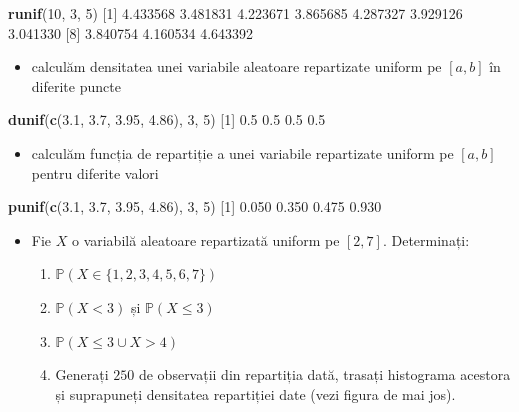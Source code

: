 \documentclass[]{article}
\newenvironment{Shaded}{\begin{snugshade}}{\end{snugshade}}
\newcommand{\KeywordTok}[1]{\textcolor[rgb]{0.13,0.29,0.53}{\textbf{#1}}}
\newcommand{\DecValTok}[1]{\textcolor[rgb]{0.00,0.00,0.81}{#1}}
\newcommand{\FloatTok}[1]{\textcolor[rgb]{0.00,0.00,0.81}{#1}}
\newcommand{\NormalTok}[1]{#1}
\providecommand{\tightlist}{%
  \setlength{\itemsep}{0pt}\setlength{\parskip}{0pt}}
\newenvironment{frshaded*}{%
  \def\FrameCommand{\fboxrule=\FrameRule\fboxsep=\FrameSep \fcolorbox{framecolor}{shadecolor1}}%
  \MakeFramed {\advance\hsize-\width \FrameRestore}}%
{\endMakeFramed}
\newenvironment{rmdblock}[1]
  {\begin{frshaded*}
  \begin{itemize}
  \renewcommand{\labelitemi}{
    \raisebox{-.7\height}[0pt][0pt]{
      {\setkeys{Gin}{width=2em,keepaspectratio}\texttt{[image: images/icons/\#1]}}
    }
  }
  \item
  }
  {
  \end{itemize}
  \end{frshaded*}
  }
\newenvironment{rmdexercise}
  {\begin{rmdblock}{exercise}}
  {\end{rmdblock}}
\begin{document}
\begin{Shaded}
\begin{Highlighting}[]
\KeywordTok{runif}\NormalTok{(}\DecValTok{10}\NormalTok{, }\DecValTok{3}\NormalTok{, }\DecValTok{5}\NormalTok{)}
\NormalTok{ [}\DecValTok{1}\NormalTok{] }\FloatTok{4.433568} \FloatTok{3.481831} \FloatTok{4.223671} \FloatTok{3.865685} \FloatTok{4.287327} \FloatTok{3.929126} \FloatTok{3.041330}
\NormalTok{ [}\DecValTok{8}\NormalTok{] }\FloatTok{3.840754} \FloatTok{4.160534} \FloatTok{4.643392}
\end{Highlighting}
\end{Shaded}

\begin{itemize}
\tightlist
\item
  calculăm densitatea unei variabile aleatoare repartizate uniform pe
  \([a, b]\) în diferite puncte
\end{itemize}

\begin{Shaded}
\begin{Highlighting}[]
\KeywordTok{dunif}\NormalTok{(}\KeywordTok{c}\NormalTok{(}\FloatTok{3.1}\NormalTok{, }\FloatTok{3.7}\NormalTok{, }\FloatTok{3.95}\NormalTok{, }\FloatTok{4.86}\NormalTok{), }\DecValTok{3}\NormalTok{, }\DecValTok{5}\NormalTok{)}
\NormalTok{[}\DecValTok{1}\NormalTok{] }\FloatTok{0.5} \FloatTok{0.5} \FloatTok{0.5} \FloatTok{0.5}
\end{Highlighting}
\end{Shaded}

\begin{itemize}
\tightlist
\item
  calculăm funcția de repartiție a unei variabile repartizate uniform pe
  \([a,b]\) pentru diferite valori
\end{itemize}

\begin{Shaded}
\begin{Highlighting}[]
\KeywordTok{punif}\NormalTok{(}\KeywordTok{c}\NormalTok{(}\FloatTok{3.1}\NormalTok{, }\FloatTok{3.7}\NormalTok{, }\FloatTok{3.95}\NormalTok{, }\FloatTok{4.86}\NormalTok{), }\DecValTok{3}\NormalTok{, }\DecValTok{5}\NormalTok{)}
\NormalTok{[}\DecValTok{1}\NormalTok{] }\FloatTok{0.050} \FloatTok{0.350} \FloatTok{0.475} \FloatTok{0.930}
\end{Highlighting}
\end{Shaded}

\begin{rmdexercise}
Fie \(X\) o variabilă aleatoare repartizată uniform pe \([2,7]\).
Determinați:

\begin{enumerate}
\def\labelenumi{\alph{enumi})}
\tightlist
\item
  \(\mathbb{P}(X\in\{1,2,3,4,5,6,7\})\)
\item
  \(\mathbb{P}(X<3)\) și \(\mathbb{P}(X\leq 3)\)
\item
  \(\mathbb{P}(X\leq 3 \cup X>4)\)
\item
  Generați \(250\) de observații din repartiția dată, trasați histograma
  acestora și suprapuneți densitatea repartiției date (vezi figura de
  mai jos).
\end{enumerate}
\end{rmdexercise}
\end{document}
